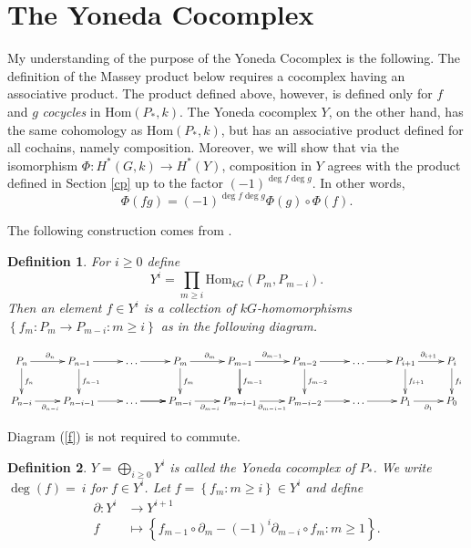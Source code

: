 \documentclass[12pt]{article}
\newtheorem{definition}{Definition}
\begin{document}
\section{The Yoneda Cocomplex}
My understanding of the purpose of the Yoneda Cocomplex
is the following. The definition of the Massey product below
requires a cocomplex having an associative product.
The product defined above,
however, is defined only for $f$ and $g$ {\em cocycles}
in $\mathrm{Hom}\left(P_\ast,k\right)$.
The Yoneda cocomplex $Y$, on the other hand, has the same
cohomology as $\mathrm{Hom}\left(P_\ast,k\right)$,
but has an associative product defined 
for all cochains, namely composition.
Moreover, we will show that via the isomorphism 
$\Phi:H^\ast\left(G,k\right)\to
H^\ast\left(Y\right)$, composition in $Y$ 
agrees with the product defined in Section \ref{cp}
up to the factor $\left(-1\right)^{\deg f\deg g}$.
In other words, \[\Phi\left(fg\right)
=\left(-1\right)^{\deg f\deg g}\Phi\left(g\right)
\circ\Phi\left(f\right).\]

The following construction comes from \cite{borge}.
\begin{definition}
For $i\ge 0$ define
\[Y^i=\prod_{m\ge i}\mathrm{Hom}_{kG}\left(P_m,P_{m-i}\right).\]
Then an element $f\in Y^i$ is a collection of $kG$-homomorphisms
$\left\{f_m:P_m\to P_{m-i}:m\ge i\right\}$
as in the following diagram.

\begin{equation}\label{f}\xymatrix{
P_n\ar[r]^{\partial_n}\ar[d]^{f_n}
&P_{n-1}\ar[r]\ar[d]^{f_{n-1}}
&\dots\ar[r]
&P_m\ar[d]^{f_m}\ar[r]^{\partial_m}
&P_{m-1}\ar[d]\ar[d]^{f_{m-1}}\ar[r]^{\partial_{m-1}}
&P_{m-2}\ar[d]^{f_{m-2}}\ar[r]
&\dots\ar[r]
&P_{i+1}\ar[r]^{\partial_{i+1}}\ar[d]^{f_{i+1}}
&P_i\ar[d]^{f_i}
\\
P_{n-i}\ar[r]_{\partial_{n-i}}
&P_{n-i-1}\ar[r]
&\dots\ar[r]\ar[r]
&P_{m-i}\ar[r]_{\partial_{m-i}}
&P_{m-i-1}\ar[r]_{\partial_{m-i-1}}
&P_{m-i-2}\ar[r]
&\dots\ar[r]
&P_1\ar[r]_{\partial_1}
&P_0
}\end{equation}
\end{definition}
Diagram (\ref{f}) is not required to commute.

\begin{definition}
$\displaystyle{Y=\bigoplus_{i\ge 0}Y^i}$
is called the {\em Yoneda cocomplex} of $P_\ast$.
We write $\deg\left(f\right)=~i$ for $f\in Y^i$.
Let $f=\left\{f_m:m\ge i\right\}\in Y^i$ and define 
\begin{align*}
\partial:Y^i&\to Y^{i+1}\\
f&\mapsto\left\{f_{m-1}\circ\partial_m
-\left(-1\right)^i\partial_{m-i}\circ f_m
:m\ge 1\right\}.
\end{align*}
\end{definition}
\end{document}
